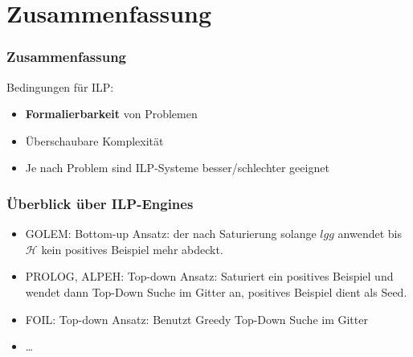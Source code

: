 \section{Zusammenfassung}
\begin{frame}
	\frametitle{Zusammenfassung}
	Bedingungen für ILP:
	\begin{itemize}
		\item \textbf{Formalierbarkeit} von Problemen
		\item Überschaubare Komplexität
		\item Je nach Problem sind ILP-Systeme besser/schlechter geeignet
	\end{itemize}
\end{frame}
\begin{frame}
	\frametitle{Überblick über ILP-Engines}
	\begin{itemize}
		\item {GOLEM: Bottom-up Ansatz: der nach Saturierung solange $lgg$ anwendet
			bis $\mathcal{H}$ kein positives Beispiel mehr abdeckt.}
		\item {PROLOG, ALPEH: Top-down Ansatz: Saturiert ein positives Beispiel
			und wendet dann Top-Down Suche im Gitter an, positives Beispiel dient
			als Seed.}
		\item {FOIL: Top-down Ansatz: Benutzt Greedy Top-Down Suche im Gitter}
		\item \ldots
	\end{itemize}
\end{frame}

